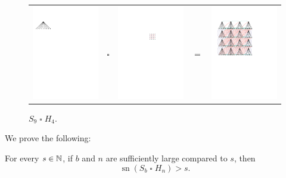 \documentclass[kpfonts]{patmorin}
\DeclareMathOperator{\sn}{sn}
\newcommand{\CartProd}{\mathbin{\square}}
\begin{document}
\begin{figure}[H]
	\centering
	\begin{tabular}{m{}m{2ex}m{}m{2ex}m{}}
		\includegraphics[width=.3\textwidth]{figs/s} & $\CartProd$ & \includegraphics[width=.2\textwidth]{figs/q} & $=$
		& \includegraphics[width=.3\textwidth]{figs/product}
	\end{tabular}
	\caption{$S_9 \CartProd H_4$.}
	\label{graph}
\end{figure}


We prove the following:

\begin{thm}
\label{Main}
For every $s\in\mathbb{N}$, if $b$ and $n$ are sufficiently large compared to $s$, then $$\sn(S_b\CartProd H_n) > s.$$
\end{thm}

\end{document}

